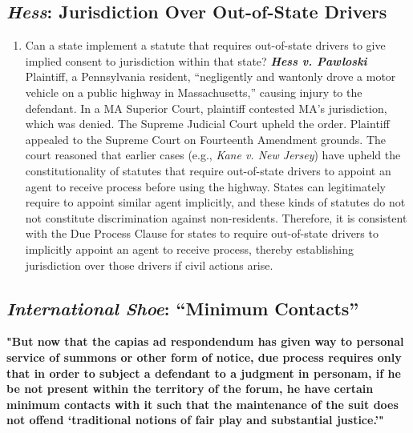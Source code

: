 \subsection{\emph{Hess}: Jurisdiction Over Out-of-State Drivers}

\begin{enumerate}
    \item Can a state implement a statute that requires out-of-state drivers 
    to give implied consent to jurisdiction within that state? 
    \textbf{\emph{Hess v. Pawloski}} Plaintiff, a Pennsylvania resident, 
    ``negligently and wantonly drove a motor vehicle on a public highway in 
    Massachusetts,'' causing injury to the defendant. In a MA Superior Court, 
    plaintiff contested MA's jurisdiction, which was denied. The Supreme 
    Judicial Court upheld the order. Plaintiff appealed to the Supreme Court 
    on Fourteenth Amendment grounds. The court reasoned that earlier cases 
    (e.g., \emph{Kane v. New Jersey}) have upheld the constitutionality of 
    statutes that require out-of-state drivers to appoint an agent to receive 
    process before using the highway. States can legitimately require to 
    appoint similar agent implicitly, and these kinds of statutes do not not 
    constitute discrimination against non-residents. Therefore, it is 
    consistent with the Due Process Clause for states to require out-of-state 
    drivers to implicitly appoint an agent to receive process, thereby 
    establishing jurisdiction over those drivers if civil actions arise.
\end{enumerate}

\subsection{\emph{International Shoe}: ``Minimum Contacts''}

\textbf{"But now that the capias ad respondendum has given way to personal 
service of summons or other form of notice, due process requires only that in 
order to subject a defendant to a judgment in personam, if he be not present 
within the territory of the forum, he have certain minimum contacts with it 
such that the maintenance of the suit does not offend `traditional notions of 
fair play and substantial justice.'"}


